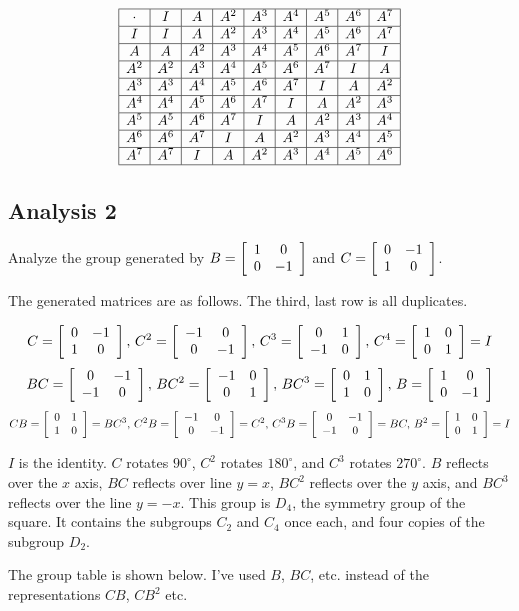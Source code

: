 \documentclass[../gatm.tex]{subfiles}
\begin{document}
$$\begin{array}{|c|c|c|c|c|c|c|c|c|}
\hline
\cdot & I & A & A^2 & A^3 & A^4 & A^5 & A^6 & A^7 \\ \hline
I & I & A & A^2 & A^3 & A^4 & A^5 & A^6 & A^7 \\ \hline
A & A & A^2 & A^3 & A^4 & A^5 & A^6 & A^7 & I \\ \hline
A^2 & A^2 & A^3 & A^4 & A^5 & A^6 & A^7 & I & A \\ \hline
A^3 & A^3 & A^4 & A^5 & A^6 & A^7 & I & A & A^2 \\ \hline
A^4 & A^4 & A^5 & A^6 & A^7 & I & A & A^2 & A^3 \\ \hline
A^5 & A^5 & A^6 & A^7 & I & A & A^2 & A^3 & A^4 \\ \hline
A^6 & A^6 & A^7 & I & A & A^2 & A^3 & A^4 & A^5 \\ \hline
A^7 & A^7 & I & A & A^2 & A^3 & A^4 & A^5 & A^6 \\ \hline
\end{array}$$

\subsection{Analysis 2}

Analyze the group generated by $B=\left[\begin{array}{cc} 1 & 0 \\ 0 & -1 \end{array}\right]$ and $C=\left[\begin{array}{cc} 0 & -1 \\ 1 & 0 \end{array}\right]$.

The generated matrices are as follows. The third, last row is all duplicates.

$$C=\left[\begin{array}{cc} 0 & -1 \\ 1 & 0 \end{array}\right],\, C^2=\left[\begin{array}{cc} -1 & 0 \\ 0 & -1 \end{array}\right],\, C^3=\left[\begin{array}{cc} 0 & 1 \\ -1 & 0 \end{array}\right],\, C^4=\left[\begin{array}{cc} 1 & 0 \\ 0 & 1 \end{array}\right]=I$$
$$BC=\left[\begin{array}{cc} 0 & -1 \\ -1 & 0 \end{array}\right],\, BC^2=\left[\begin{array}{cc} -1 & 0 \\ 0 & 1 \end{array}\right],\, BC^3 = \left[\begin{array}{cc} 0 & 1 \\ 1 & 0 \end{array}\right],\, B = \left[\begin{array}{cc} 1 & 0 \\ 0 & -1 \end{array}\right]$$
$$CB=\left[\begin{array}{cc} 0 & 1 \\ 1 & 0 \end{array}\right]=BC^3,\, C^2B=\left[\begin{array}{cc} -1 & 0 \\ 0 & -1 \end{array}\right]=C^2,\, C^3B=\left[\begin{array}{cc} 0 & -1 \\ -1 & 0 \end{array}\right]=BC,\, B^2=\left[\begin{array}{cc} 1 & 0 \\ 0 & 1 \end{array}\right]=I$$

$I$ is the identity. $C$ rotates $90^\circ$, $C^2$ rotates $180^\circ$, and $C^3$ rotates $270^\circ$. $B$ reflects over the $x$ axis, $BC$ reflects over line $y=x$, $BC^2$ reflects over the $y$ axis, and $BC^3$ reflects over the line $y=-x$. This group is $D_4$, the symmetry group of the square. It contains the subgroups $C_2$ and $C_4$ once each, and four copies of the subgroup $D_2$.

The group table is shown below. I've used $B$, $BC$, etc. instead of the representations $CB$, $CB^2$ etc.
\end{document}
